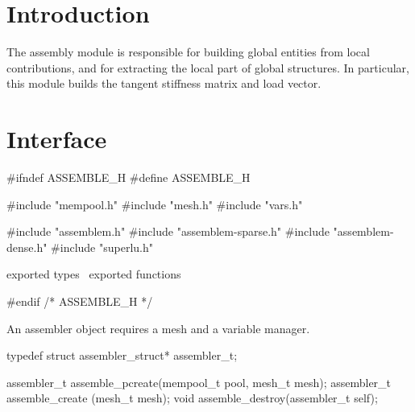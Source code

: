 
\section{Introduction}

The assembly module is responsible for building global entities
from local contributions, and for extracting the local part of
global structures.  In particular, this module builds the tangent
stiffness matrix and load vector.


\section{Interface}

\endmoddef
#ifndef ASSEMBLE_H
#define ASSEMBLE_H

#include "mempool.h"
#include "mesh.h"
#include "vars.h"

#include "assemblem.h"
#include "assemblem-sparse.h"
#include "assemblem-dense.h"
#include "superlu.h"

\LA{}exported types~{\nwtagstyle{}}\RA{}
\LA{}exported functions~{\nwtagstyle{}}\RA{}

#endif /* ASSEMBLE_H */
\nwendcode{}\nwdocspar

An assembler object requires a mesh and a variable manager.

\nwenddocs{}\endmoddef
typedef struct assembler_struct* assembler_t;

\nwendcode{}\nwdocspar

\nwenddocs{}\endmoddef
assembler_t assemble_pcreate(mempool_t pool, mesh_t mesh);
assembler_t assemble_create (mesh_t mesh);
void        assemble_destroy(assembler_t self);

\nwendcode{}\nwdocspar

